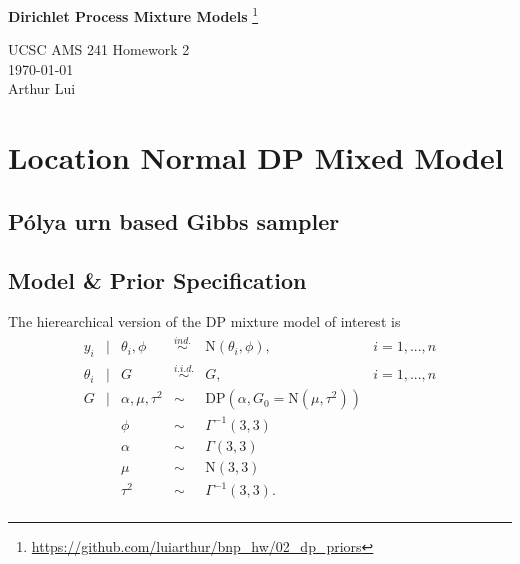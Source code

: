 \documentclass{article}
\def\wl{\par \vspace{\baselineskip}\noindent}
\def\beginmyfig{\begin{figure}[htbp]\begin{center}}
\def\endmyfig{\end{center}\end{figure}}
\def\hline{ \textcolor{lgrey}{\hrulefill} }
\begin{document}
\begin{center}
  {\huge \textbf{Dirichlet Process Mixture Models}
    \footnote{\url{https://github.com/luiarthur/bnp_hw/02_dp_priors}}
  }\\
  \wl
  UCSC AMS 241 Homework 2\\
  \noindent\today\\
  Arthur Lui\\
  \hline
\end{center}

\section{Location Normal DP Mixed Model}

\subsection{P\'olya urn based Gibbs sampler}

\subsection{Model \& Prior Specification}
The hierearchical version of the DP mixture model of interest is 
\[
\begin{array}{rclcll}
  y_i &|& \theta_i,\phi &\overset{ind.}{\sim}& \text{N}(\theta_i, \phi), & i = 1,...,n\\
  \theta_i &|& G &\overset{i.i.d.}{\sim}&  G, & i = 1,...,n\\
  G &|& \alpha, \mu, \tau^2 &\sim& \text{DP}(\alpha, G_0=\text{N}(\mu,\tau^2))\\
    && \phi &\sim& \Gamma^{-1}(3,3) \\
    && \alpha &\sim& \Gamma(3,3) \\
    && \mu &\sim& \text{N}(3,3) \\
    && \tau^2 &\sim& \Gamma^{-1}(3,3).\\
\end{array}
\]



\end{document}

